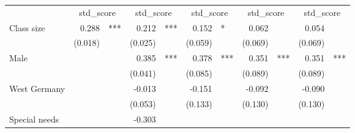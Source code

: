 \documentclass{article}
\begin{document}
\begin{table}[!h]
\centering
\begin{tabular}{lllllllllll}
\cline{1-11}
\multicolumn{1}{r}{} &
  \multicolumn{2}{c}{std\_score} &
  \multicolumn{2}{c}{std\_score} &
  \multicolumn{2}{c}{std\_score} &
  \multicolumn{2}{c}{std\_score} &
  \multicolumn{2}{c}{std\_score} \\
\cline{1-11}
\multicolumn{1}{l}{Class size} &
  \multicolumn{1}{r}{0.288} &
  \multicolumn{1}{l}{***} &
  \multicolumn{1}{r}{0.212} &
  \multicolumn{1}{l}{***} &
  \multicolumn{1}{r}{0.152} &
  \multicolumn{1}{l}{*} &
  \multicolumn{1}{r}{0.062} &
  \multicolumn{1}{l}{} &
  \multicolumn{1}{r}{0.054} &
  \multicolumn{1}{l}{} \\
\multicolumn{1}{l}{} &
  \multicolumn{1}{r}{(0.018)} &
  \multicolumn{1}{l}{} &
  \multicolumn{1}{r}{(0.025)} &
  \multicolumn{1}{l}{} &
  \multicolumn{1}{r}{(0.059)} &
  \multicolumn{1}{l}{} &
  \multicolumn{1}{r}{(0.069)} &
  \multicolumn{1}{l}{} &
  \multicolumn{1}{r}{(0.069)} &
  \multicolumn{1}{l}{} \\
\multicolumn{1}{l}{Male} &
  \multicolumn{1}{r}{} &
  \multicolumn{1}{l}{} &
  \multicolumn{1}{r}{0.385} &
  \multicolumn{1}{l}{***} &
  \multicolumn{1}{r}{0.378} &
  \multicolumn{1}{l}{***} &
  \multicolumn{1}{r}{0.351} &
  \multicolumn{1}{l}{***} &
  \multicolumn{1}{r}{0.351} &
  \multicolumn{1}{l}{***} \\
\multicolumn{1}{l}{} &
  \multicolumn{1}{r}{} &
  \multicolumn{1}{l}{} &
  \multicolumn{1}{r}{(0.041)} &
  \multicolumn{1}{l}{} &
  \multicolumn{1}{r}{(0.085)} &
  \multicolumn{1}{l}{} &
  \multicolumn{1}{r}{(0.089)} &
  \multicolumn{1}{l}{} &
  \multicolumn{1}{r}{(0.089)} &
  \multicolumn{1}{l}{} \\
\multicolumn{1}{l}{West Germany} &
  \multicolumn{1}{r}{} &
  \multicolumn{1}{l}{} &
  \multicolumn{1}{r}{-0.013} &
  \multicolumn{1}{l}{} &
  \multicolumn{1}{r}{-0.151} &
  \multicolumn{1}{l}{} &
  \multicolumn{1}{r}{-0.092} &
  \multicolumn{1}{l}{} &
  \multicolumn{1}{r}{-0.090} &
  \multicolumn{1}{l}{} \\
\multicolumn{1}{l}{} &
  \multicolumn{1}{r}{} &
  \multicolumn{1}{l}{} &
  \multicolumn{1}{r}{(0.053)} &
  \multicolumn{1}{l}{} &
  \multicolumn{1}{r}{(0.133)} &
  \multicolumn{1}{l}{} &
  \multicolumn{1}{r}{(0.130)} &
  \multicolumn{1}{l}{} &
  \multicolumn{1}{r}{(0.130)} &
  \multicolumn{1}{l}{} \\
\multicolumn{1}{l}{Special needs} &
  \multicolumn{1}{r}{} &
  \multicolumn{1}{l}{} &
  \multicolumn{1}{r}{-0.303} &

\end{tabular}
\end{table}
\end{document}
